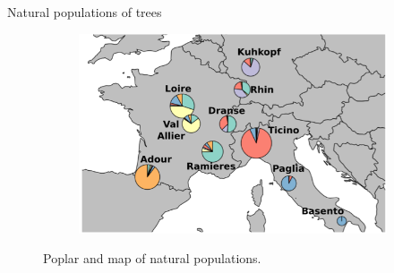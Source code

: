 \documentclass[11pt]{beamer}
\begin{document}
\begin{frame}{Natural populations of trees}
\begin{figure}[H]
{\begin{subfigure}{.45\textwidth}
	\includegraphics[width=\linewidth]{images/carte-genotypes.png}
\end{subfigure}
}
\caption{Poplar and map of natural populations.}
\end{figure}
\end{frame}
\end{document}
